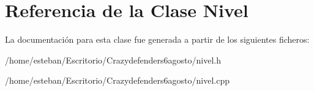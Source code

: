 \hypertarget{class_nivel}{\section{Referencia de la Clase Nivel}
\label{class_nivel}
}


La documentación para esta clase fue generada a partir de los siguientes ficheros\+:\begin{DoxyCompactItemize}
\item 
/home/esteban/\+Escritorio/\+Crazydefenders6agosto/nivel.\+h\item 
/home/esteban/\+Escritorio/\+Crazydefenders6agosto/nivel.\+cpp\end{DoxyCompactItemize}
